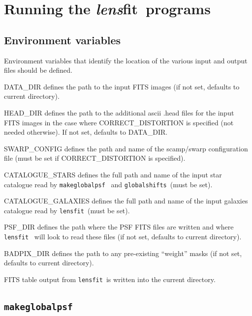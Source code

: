 \documentclass{article}
\def\lensfit{{\tt lensfit}\ }
\def\globalshifts{{\tt globalshifts}\ }
\def\makeglobalpsf{{\tt makeglobalpsf}\ }
\def\lensfitsuite{{\em lens}fit\ }
\begin{document}
\section{Running the \lensfitsuite programs}

\subsection{Environment variables}
Environment variables that identify the location of the various input and output files should be defined. 

\begin{list}{}{\itemsep=0mm \leftmargin=5mm}
\item DATA\_DIR defines the path to the input FITS images (if not set, defaults to current directory). 
\item HEAD\_DIR defines the path to the additional ascii .head files for the input FITS images in the case where 
CORRECT\_DISTORTION is specified (not needed otherwise). If not set, defaults to DATA\_DIR. 
\item SWARP\_CONFIG defines the path and name of the scamp/swarp 
configuration file (must be set if CORRECT\_DISTORTION is specified). 
\item CATALOGUE\_STARS defines the full path and name of the input star catalogue read by \makeglobalpsf 
and \globalshifts (must be set).
\item CATALOGUE\_GALAXIES defines the full path and name of the input galaxies catalogue
read by \lensfit (must be set).
\item PSF\_DIR defines the path where the PSF FITS files are written and where \lensfit 
will look to read these files (if not set, defaults to current directory). 
\item BADPIX\_DIR defines the path to any pre-existing ``weight'' masks (if not set, defaults to current 
directory). 
\end{list}

FITS table output from \lensfit is written into the current directory. 

\subsection{\makeglobalpsf}
\end{document}
